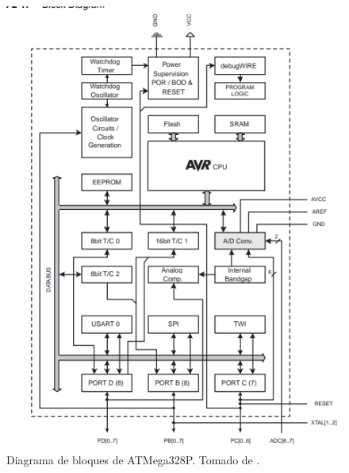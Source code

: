 \begin{figure}[H]
\centering
\includegraphics[width=.8\linewidth]{Imagenes/1.png}
 \caption{Diagrama de bloques de ATMega328P. Tomado de \cite{web1}.}
 \label{fig1}
\end{figure}

